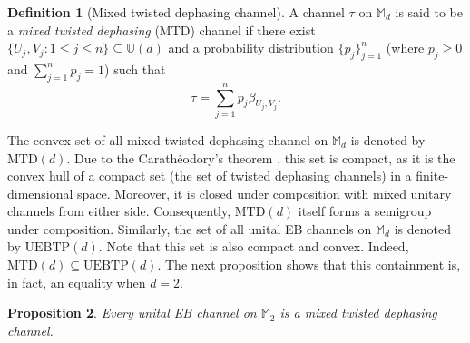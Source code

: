 \documentclass[11pt,reqno]{amsart}
\theoremstyle{definition}
\newtheorem{defn}{Definition}[section]
\theoremstyle{plain}
\newtheorem{prop}[defn]{Proposition}
\theoremstyle{remark}
\numberwithin{equation}{section}%
\begin{document}
 
 \begin{defn}[Mixed twisted dephasing channel]
 	A channel $\tau$ on $\mathbb{M}_d$ is said to be a \textit{mixed twisted dephasing} (MTD) channel if there exist $\{U_j, V_j: 1\leq j\leq n\}\subseteq \mathbb{U}(d)$ and a probability distribution $\{p_j\}_{j=1}^n$ (where $p_j \ge 0$ and $\sum_{j=1}^n p_j=1$) such that
 	\[\tau = \sum_{j=1}^n p_j \beta_{U_j, V_j}.\]
 \end{defn}
 
 
 The convex set of all mixed twisted dephasing channel on $\mathbb{M}_d$ is denoted by $\mathrm{MTD}(d)$. Due to the Carath\'{e}odory's theorem \cite{RocRT70}, this set is compact, as it is the convex hull of a compact set (the set of twisted dephasing channels) in a finite-dimensional space.  Moreover, it is closed under composition with mixed unitary channels from either side. Consequently, $\mathrm{MTD}(d)$ itself forms a semigroup under composition. Similarly, the set of all unital EB channels on $\mathbb{M}_d$ is denoted by $\mathrm{UEBTP}(d)$. Note that this set is also compact and convex. Indeed, $\mathrm{MTD}(d)\subseteq\mathrm{UEBTP}(d)$. The next proposition shows that this containment is, in fact, an equality when $d=2$.
 
 
 \begin{prop}\label{extreme point for M_2}
 	Every unital EB channel on $\mathbb{M}_2$ is a mixed twisted dephasing channel.
 \end{prop}
 
\end{document}
